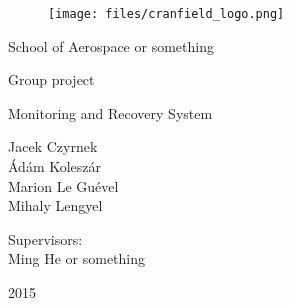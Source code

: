 \begin{titlepage}
	\begin{figure}[t!]
		\centering
		\texttt{[image: files/cranfield\_logo.png]}
	\end{figure}
	\begin{center}
		\large School of Aerospace or something
		
		\vspace{64pt}
		\large Group project
		
		\huge Monitoring and Recovery System
		
		\vspace{64pt}
		\large Jacek Czyrnek\\
		\large Ádám Koleszár\\
		\large Marion Le Guével\\
		\large Mihaly Lengyel
		
		\vspace{64pt}
		\large Supervisors:\\		
		\large Ming He or something
		
		\vspace{64pt}
		\large 2015
	\end{center}
\end{titlepage}